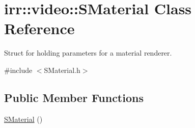 \hypertarget{classirr_1_1video_1_1SMaterial}{}\section{irr\+:\+:video\+:\+:S\+Material Class Reference}
\label{classirr_1_1video_1_1SMaterial}


Struct for holding parameters for a material renderer.  




{\ttfamily \#include $<$S\+Material.\+h$>$}

\subsection*{Public Member Functions}
\begin{DoxyCompactItemize}
\item 
\hyperlink{classirr_1_1video_1_1SMaterial_ae5002c3c8ea002539228a9ca95cc8003}{S\+Material} ()\hypertarget{classirr_1_1video_1_1SMaterial_ae5002c3c8ea002539228a9ca95cc8003}{}\label{classirr_1_1video_1_1SMaterial_ae5002c3c8ea002539228a9ca95cc8003}


\end{DoxyCompactItemize}

